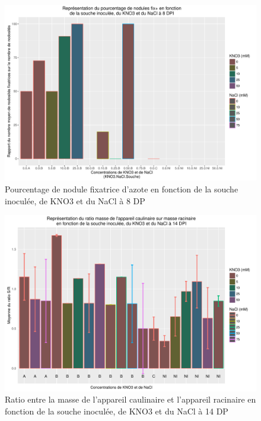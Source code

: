 \documentclass[12pt,a4paper,onecolumn]{article}
\begin{document}
		\begin{figure}[p]
			\begin{center}
				\includegraphics[width=0.9\linewidth]{rapfix+nod8.pdf}
			\end{center}
			\caption{Pourcentage de nodule fixatrice d’azote en fonction de la souche inoculée, de KNO3 et du NaCl à 8 DP}
			\label{fix+-8}
		\end{figure}

		\begin{figure}[p]
			\begin{center}
				\includegraphics[width=0.9\linewidth]{SR14.pdf}
			\end{center}
			\caption{Ratio entre la masse de l’appareil caulinaire et l’appareil racinaire en fonction  de la souche inoculée, de KNO3 et du NaCl à 14 DP}
			\label{SR14}
		\end{figure}
\end{document}
